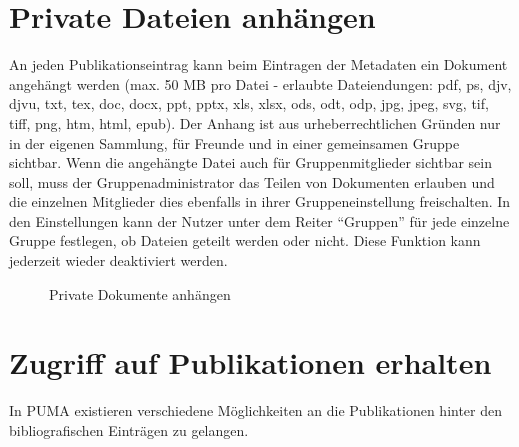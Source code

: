 \section{Private Dateien anhängen}
An jeden Publikationseintrag kann beim Eintragen der Metadaten ein Dokument angehängt werden (max. 50 MB pro Datei - erlaubte Dateiendungen: pdf, ps, djv, djvu, txt, tex, doc, docx, ppt, pptx, xls, xlsx, ods, odt, odp, jpg, jpeg, svg, tif, tiff, png, htm, html, epub). Der Anhang ist aus urheberrechtlichen Gründen nur in der eigenen Sammlung, für Freunde und in einer gemeinsamen Gruppe sichtbar.
Wenn die angehängte Datei auch für Gruppenmitglieder sichtbar sein soll, muss der Gruppenadministrator das Teilen von Dokumenten erlauben
und die einzelnen Mitglieder dies ebenfalls in ihrer Gruppeneinstellung freischalten. In den Einstellungen kann der Nutzer unter dem Reiter \enquote{Gruppen} für jede einzelne Gruppe festlegen, ob Dateien geteilt werden oder nicht. Diese Funktion kann jederzeit wieder deaktiviert werden.
\begin{figure}[h!]
 \centering
 \caption{Private Dokumente anhängen}
 \label{figure028}
\end{figure}

\section{Zugriff auf Publikationen erhalten}
\label{subsec:OpenURL}
In PUMA existieren verschiedene Möglichkeiten an die Publikationen hinter den bibliografischen Einträgen zu gelangen. 
